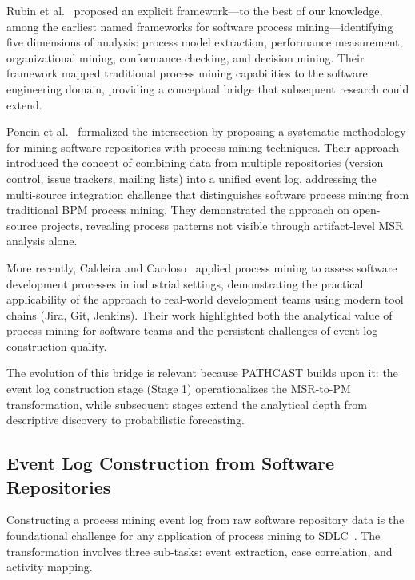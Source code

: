 Rubin et al.~\cite{rubin2007} proposed an explicit framework---to the
best of our knowledge, among the earliest named frameworks for software
process mining---identifying five dimensions of analysis: process model
extraction, performance measurement, organizational mining, conformance
checking, and decision mining. Their framework mapped traditional process
mining capabilities to the software engineering domain, providing a
conceptual bridge that subsequent research could extend.

Poncin et al.~\cite{poncin2011process} formalized the intersection by
proposing a systematic methodology for mining software repositories with
process mining techniques. Their approach introduced the concept of
combining data from multiple repositories (version control, issue
trackers, mailing lists) into a unified event log, addressing the
multi-source integration challenge that distinguishes software process
mining from traditional BPM process mining. They demonstrated the
approach on open-source projects, revealing process patterns not visible
through artifact-level MSR analysis alone.

More recently, Caldeira and Cardoso~\cite{Caldeira2019AssessingSoftwareTeams} applied
process mining to assess software development processes in industrial
settings, demonstrating the practical applicability of the approach to
real-world development teams using modern tool chains (Jira, Git,
Jenkins). Their work highlighted both the analytical value of process
mining for software teams and the persistent challenges of event log
construction quality.

The evolution of this bridge is relevant because PATHCAST builds
upon it: the event log construction stage (Stage 1) operationalizes the
MSR-to-PM transformation, while subsequent stages extend the analytical
depth from descriptive discovery to probabilistic forecasting.


\subsection{Event Log Construction from Software Repositories}
\label{sec:event-log-construction}

Constructing a process mining event log from raw software repository data
is the foundational challenge for any application of process mining to
SDLC~\cite{poncin2011process}. The transformation involves three
sub-tasks: event extraction, case correlation, and activity mapping.

